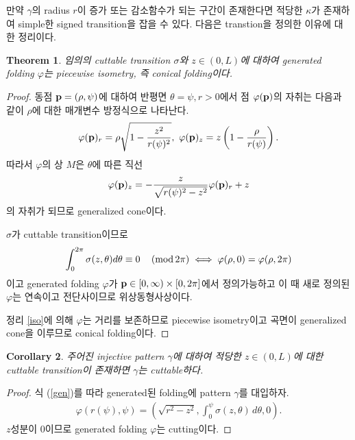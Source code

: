 \documentclass{amsart}
\theoremstyle{plain}
\newtheorem{theorem}{Theorem}[section]
\newtheorem{corollary}[theorem]{Corollary}
\theoremstyle{definition}
\theoremstyle{remark}
\begin{document}
만약 $\gamma$의 radius $r$이 증가 또는 감소함수가 되는 구간이 존재한다면 적당한 $\kappa$가 존재하여 simple한 signed transition을 잡을 수 있다.
다음은 transtion을 정의한 이유에 대한 정리이다.

\begin{theorem}%
임의의 cuttable transition $\sigma$와 $z\in(0,L)$에 대하여 generated folding $\varphi$는 piecewise isometry, 즉 conical folding이다.
\end{theorem}

\begin{proof}
동점 ${\bold p}=(\rho,\psi)$에 대하여 반평면 $\theta=\psi,r>0$에서 점 $\varphi({\bold p})$의 자취는 다음과 같이 $\rho$에 대한 매개변수 방정식으로 나타난다.
\begin{align*}
\varphi({\bold p})_r=\rho\sqrt{1-\frac{z^2}{r(\psi)^2}},\ 
\varphi({\bold p})_z=z\left(1-\frac{\rho}{r(\psi)}\right).
\end{align*}
따라서 $\varphi$의 상 $M$은 $\theta$에 따른 직선
\begin{align*}
\varphi({\bold p})_z=-\frac{z}{\sqrt{r(\psi)^2-z^2}}\varphi({\bold p})_r+z
\end{align*}
의 자취가 되므로 generalized cone이다.

$\sigma$가 cuttable transition이므로
\begin{align*}
\int_0^{2\pi}\sigma(z,\theta)d\theta\equiv0\quad\left({\rm mod}\, 2\pi\right)\iff\varphi(\rho,0)=\varphi(\rho,2\pi)
\end{align*}
이고 generated folding $\varphi$가 ${\bold p}\in[0,\infty)\times[0,2\pi]$에서 정의가능하고 이 때 새로 정의된 $\varphi$는 연속이고 전단사이므로 위상동형사상이다.

정리 \ref{iso}에 의해 $\varphi$는 거리를 보존하므로 piecewise isometry이고 곡면이 generalized cone을 이루므로 conical folding이다.
\end{proof}

\begin{corollary}\label{34}%
주어진 injective pattern $\gamma$에 대하여 적당한 $z\in(0,L)$에 대한 cuttable transition이 존재하면 $\gamma$는 cuttable하다.
\end{corollary}

\begin{proof}
식 (\ref{gen})를 따라 generated된 folding에 pattern $\gamma$를 대입하자.
\begin{align*}
\varphi\left(r(\psi),\psi\right)=\left(\sqrt{r^2-z^2},\int^{\psi}_0 \sigma(z,\theta)\,d\theta,0\right).
\end{align*}
$z$성분이 $0$이므로 generated folding $\varphi$는 cutting이다.
\end{proof}
\end{document}
